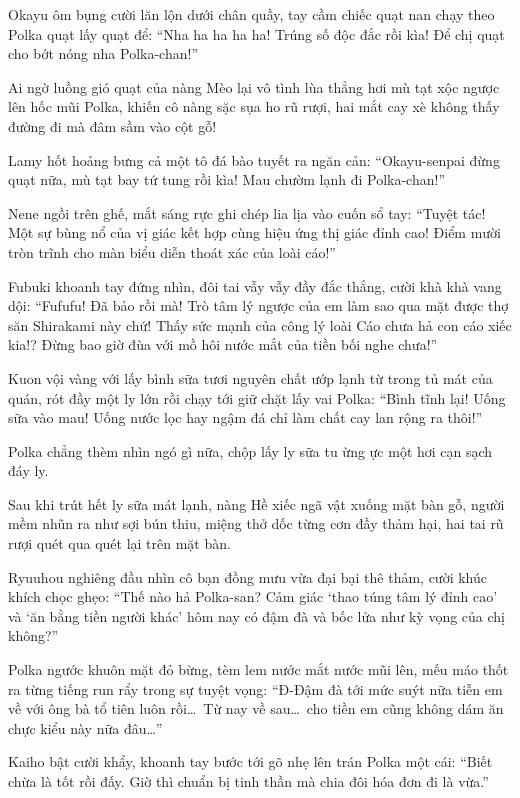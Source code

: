 \documentclass[../main.tex]{subfiles}
\begin{document}
Okayu ôm bụng cười lăn lộn dưới chân quầy, tay cầm chiếc quạt nan chạy theo Polka quạt lấy quạt để: ``Nha ha ha ha ha! Trúng số độc đắc rồi kìa! Để chị quạt cho bớt nóng nha Polka-chan!''

Ai ngờ luồng gió quạt của nàng Mèo lại vô tình lùa thẳng hơi mù tạt xộc ngược lên hốc mũi Polka, khiến cô nàng sặc sụa ho rũ rượi, hai mắt cay xè không thấy đường đi mà đâm sầm vào cột gỗ!

Lamy hốt hoảng bưng cả một tô đá bào tuyết ra ngăn cản: ``Okayu-senpai đừng quạt nữa, mù tạt bay tứ tung rồi kìa! Mau chườm lạnh đi Polka-chan!''

Nene ngồi trên ghế, mắt sáng rực ghi chép lia lịa vào cuốn sổ tay: ``Tuyệt tác! Một sự bùng nổ của vị giác kết hợp cùng hiệu ứng thị giác đỉnh cao! Điểm mười tròn trĩnh cho màn biểu diễn thoát xác của loài cáo!''

Fubuki khoanh tay đứng nhìn, đôi tai vẫy vẫy đầy đắc thắng, cười khà khà vang dội: ``Fufufu! Đã bảo rồi mà! Trò tâm lý ngược của em làm sao qua mặt được thợ săn Shirakami này chứ! Thấy sức mạnh của công lý loài Cáo chưa hả con cáo xiếc kia!? Đừng bao giờ đùa với mồ hôi nước mắt của tiền bối nghe chưa!''

Kuon vội vàng với lấy bình sữa tươi nguyên chất ướp lạnh từ trong tủ mát của quán, rót đầy một ly lớn rồi chạy tới giữ chặt lấy vai Polka: ``Bình tĩnh lại! Uống sữa vào mau! Uống nước lọc hay ngậm đá chỉ làm chất cay lan rộng ra thôi!''

Polka chẳng thèm nhìn ngó gì nữa, chộp lấy ly sữa tu ừng ực một hơi cạn sạch đáy ly.

Sau khi trút hết ly sữa mát lạnh, nàng Hề xiếc ngã vật xuống mặt bàn gỗ, người mềm nhũn ra như sợi bún thiu, miệng thở dốc từng cơn đầy thảm hại, hai tai rũ rượi quét qua quét lại trên mặt bàn.

Ryuuhou nghiêng đầu nhìn cô bạn đồng mưu vừa đại bại thê thảm, cười khúc khích chọc ghẹo: ``Thế nào hả Polka-san? Cảm giác `thao túng tâm lý đỉnh cao' và `ăn bằng tiền người khác' hôm nay có đậm đà và bốc lửa như kỳ vọng của chị không?''

Polka ngước khuôn mặt đỏ bừng, tèm lem nước mắt nước mũi lên, mếu máo thốt ra từng tiếng run rẩy trong sự tuyệt vọng: ``Đ-Đậm đà tới mức suýt nữa tiễn em về với ông bà tổ tiên luôn rồi\dots\ Từ nay về sau\dots\ cho tiền em cũng không dám ăn chực kiểu này nữa đâu\dots''

Kaiho bật cười khẩy, khoanh tay bước tới gõ nhẹ lên trán Polka một cái: ``Biết chừa là tốt rồi đấy. Giờ thì chuẩn bị tinh thần mà chia đôi hóa đơn đi là vừa.''
\end{document}
